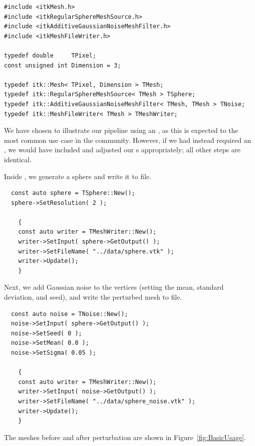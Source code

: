 \documentclass{InsightArticle}
\begin{document}
\begin{verbatim}
#include <itkMesh.h>
#include <itkRegularSphereMeshSource.h>
#include <itkAdditiveGaussianNoiseMeshFilter.h>
#include <itkMeshFileWriter.h>

typedef double     TPixel;
const unsigned int Dimension = 3;

typedef itk::Mesh< TPixel, Dimension > TMesh;
typedef itk::RegularSphereMeshSource< TMesh > TSphere;
typedef itk::AdditiveGaussianNoiseMeshFilter< TMesh, TMesh > TNoise;
typedef itk::MeshFileWriter< TMesh > TMeshWriter;
\end{verbatim}

We have chosen to illustrate our pipeline using an , as this is expected to the most common use case in the community.  However, if we had instead required an , we would have included  and adjusted our s appropriately; all other steps are identical.

Inside , we generate a sphere and write it to file.

\begin{verbatim}
  const auto sphere = TSphere::New();
  sphere->SetResolution( 2 );

    {   
    const auto writer = TMeshWriter::New();
    writer->SetInput( sphere->GetOutput() );
    writer->SetFileName( "../data/sphere.vtk" );
    writer->Update();
    }
\end{verbatim}

Next, we add Gaussian noise to the vertices (setting the mean, standard deviation, and seed), and write the perturbed mesh to file.

\begin{verbatim}
  const auto noise = TNoise::New();
  noise->SetInput( sphere->GetOutput() );
  noise->SetSeed( 0 );
  noise->SetMean( 0.0 );
  noise->SetSigma( 0.05 );

    {
    const auto writer = TMeshWriter::New();
    writer->SetInput( noise->GetOutput() );
    writer->SetFileName( "../data/sphere_noise.vtk" );
    writer->Update();
    }
\end{verbatim}

The meshes before and after perturbation are shown in Figure~\ref{fig:BasicUsage}.
\end{document}
